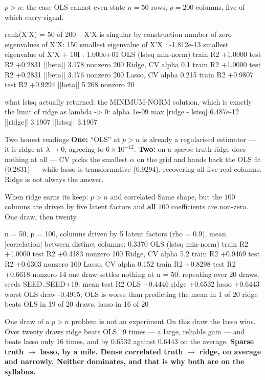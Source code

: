 \documentclass[aspectratio=169]{beamer}
\begin{document}
\begin{frame}[fragile,shrink=8]{$p > n$: the case OLS cannot even state}
$n = 50$ rows, $p = 200$ columns, five of which carry signal.
\begin{outblk}
rank(X'X) = 50 of 200 -- X'X is singular by construction
number of zero eigenvalues of X'X: 150
smallest eigenvalue of X'X       : -1.812e-13
smallest eigenvalue of X'X + 10I : 1.000e+01
  OLS (lstsq min-norm)   train R2 +1.0000  test R2 +0.2831  ||beta||    3.178  nonzero 200
  Ridge, CV alpha 0.1    train R2 +1.0000  test R2 +0.2831  ||beta||    3.176  nonzero 200
  Lasso, CV alpha 0.215  train R2 +0.9807  test R2 +0.9294  ||beta||    5.268  nonzero  20
\end{outblk}
\begin{outblk}
what lstsq actually returned: the MINIMUM-NORM solution, which is
exactly the limit of ridge as lambda -> 0:
   alpha 1e-09   max |ridge - lstsq| 6.487e-12   ||ridge|| 3.1907  ||lstsq|| 3.1907
\end{outblk}
\begin{alertblock}{Two honest readings}
  \footnotesize \textbf{One:} ``OLS'' at $p>n$ is already a regularised
  estimator --- it is ridge at $\lambda \to 0$, agreeing to $6\times10^{-12}$.
  \textbf{Two:} on a \emph{sparse} truth ridge does nothing at all --- CV
  picks the smallest $\alpha$ on the grid and hands back the OLS fit
  ($0.2831$) --- while lasso is transformative ($\mathbf{0.9294}$),
  recovering all five real columns. Ridge is not always the answer.
\end{alertblock}
\end{frame}

\begin{frame}[fragile,shrink=10]{When ridge earns its keep: $p>n$ and correlated}
Same shape, but the $100$ columns are driven by five latent factors and
\textbf{all} $100$ coefficients are non-zero. One draw, then twenty.
\begin{outblk}
n = 50, p = 100, columns driven by 5 latent factors (rho = 0.9),
mean |correlation| between distinct columns: 0.3370
  OLS (lstsq min-norm)     train R2 +1.0000  test R2 +0.4183   nonzero 100
  Ridge, CV alpha 5.2      train R2 +0.9469  test R2 +0.6303   nonzero 100
  Lasso, CV alpha 0.152    train R2 +0.8298  test R2 +0.6618   nonzero  14
one draw settles nothing at n = 50. repeating over 20 draws,
seeds SEED..SEED+19:
  mean test R2   OLS +0.4446   ridge +0.6532   lasso +0.6443
  worst OLS draw -0.4915; OLS is worse than predicting the mean in 1 of 20
  ridge beats OLS in 19 of 20 draws, lasso in 16 of 20
\end{outblk}
\begin{alertblock}{One draw of a $p>n$ problem is not an experiment}
  \footnotesize On this draw the lasso wins. Over twenty draws ridge beats
  OLS $19$ times --- a large, reliable gain --- and beats lasso only $16$
  times, and by $0.6532$ against $0.6443$ on the average. \textbf{Sparse truth $\to$ lasso, by a
  mile. Dense correlated truth $\to$ ridge, on average and narrowly. Neither
  dominates, and that is why both are on the syllabus.}
\end{alertblock}
\end{frame}
\end{document}
